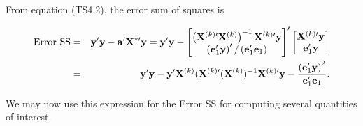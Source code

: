 From equation (TS4.2), the error sum of squares is

\begin{center}
\begin{eqnarray} \label{E5:OVErrorSS}
\text{Error SS} &=&\mathbf{y}^{\prime }\mathbf{y}-\mathbf{a}^{\prime }%
\mathbf{X}^{\mathbf{\ast }\prime }\mathbf{y}=\mathbf{y}^{\prime }\mathbf{y}-%
\begin{bmatrix} \notag
\left( \mathbf{X}^{(k)\prime }\mathbf{X}^{(k)}\right) ^{-1}\mathbf{X}%
^{(k)\prime }\mathbf{y} \\
\left( \mathbf{e}_{1}^{\prime }\mathbf{y}\right) ^{\prime }/\left(
\mathbf{e}_{1}^{\prime }\mathbf{e}_{1}\right)
\end{bmatrix}%
^{\prime }%
\begin{bmatrix} \notag
\mathbf{X}^{(k)\prime }\mathbf{y} \\
\mathbf{e}_{1}^{\prime }\mathbf{y}%
\end{bmatrix}
\\
&=&\mathbf{y}^{\prime }\mathbf{y}-\mathbf{y}^{\prime }\mathbf{X}^{(k)}(%
\mathbf{X}^{(k)\prime }(\mathbf{X}^{(k)})^{-1}\mathbf{X}^{(k)\prime }\mathbf{%
y}-\frac{\left( \mathbf{e}_{1}^{\prime }\mathbf{y}\right) ^{2}}{%
\mathbf{e}_{1}^{\prime }\mathbf{e}_{1}}.
\end{eqnarray}
\end{center}

We may now use this expression for the Error SS for computing several
quantities of interest.


